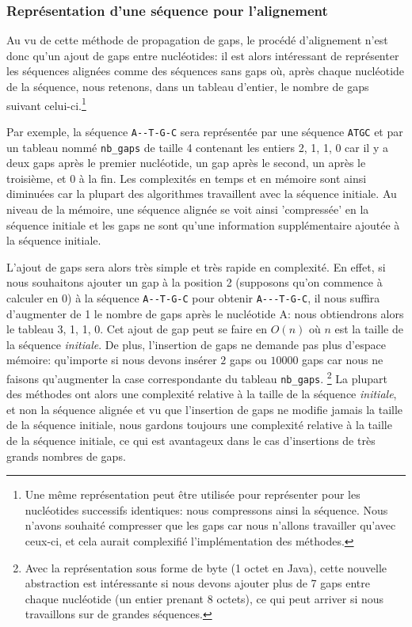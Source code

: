 \subsubsection{Représentation d'une séquence pour l'alignement}
\label{subsubsection:repr_sequence_alignment}

Au vu de cette méthode de propagation de gaps, le procédé d'alignement n'est
donc qu'un ajout de gaps entre nucléotides: il est alors intéressant de
représenter les séquences alignées comme des séquences sans gaps où, après
chaque nucléotide de la séquence, nous retenons, dans un tableau d'entier, le
nombre de gaps suivant celui-ci.\footnote{Une même représentation peut être
	utilisée pour représenter pour les nucléotides successifs identiques: nous
	compressons ainsi la séquence. Nous n'avons souhaité compresser que les gaps
	car nous n'allons travailler qu'avec ceux-ci, et cela aurait complexifié
l'implémentation des méthodes.}

Par exemple, la séquence \verb|A--T-G-C| sera représentée par une séquence
\verb|ATGC| et par un tableau nommé \verb|nb_gaps| de taille 4
contenant les entiers {2, 1, 1, 0} car il y a deux gaps après le premier
nucléotide, un gap après le second, un après le troisième, et 0 à la fin. Les
complexités en temps et en mémoire sont ainsi diminuées car la plupart des
algorithmes travaillent avec la séquence initiale.
Au niveau de la mémoire, une séquence alignée se voit ainsi 'compressée' en la
séquence initiale et les gaps ne sont qu'une information supplémentaire ajoutée
à la séquence initiale.

L'ajout de gaps sera alors très simple et très rapide en complexité. En effet,
si nous souhaitons ajouter un gap à la position 2 (supposons qu'on commence à
calculer en 0) à la séquence \verb|A--T-G-C| pour obtenir \verb|A---T-G-C|, il
nous suffira d'augmenter de 1 le nombre de gaps après le nucléotide A: nous
obtiendrons alors le tableau {3, 1, 1, 0}. Cet ajout de gap peut se faire en
$O(n)$ où $n$ est la taille de la séquence \textit{initiale}. De plus,
l'insertion de gaps ne demande pas plus d'espace mémoire: qu'importe si nous
devons insérer $2$ gaps ou $10000$ gaps car nous ne faisons qu'augmenter la case
correspondante du tableau \verb|nb_gaps|. \footnote{Avec la représentation sous
	forme de byte (1 octet en Java), cette nouvelle abstraction est intéressante
si nous devons ajouter plus de 7 gaps entre chaque nucléotide (un entier prenant
8 octets), ce qui peut arriver si nous travaillons sur de grandes séquences.} La
plupart des méthodes ont alors une complexité relative à la taille de la
séquence \textit{initiale}, et non la séquence alignée et vu que l'insertion de
gaps ne modifie jamais la taille de la séquence initiale, nous
gardons toujours une complexité relative à la taille de la séquence initiale, ce
qui est avantageux dans le cas d'insertions de très grands nombres de gaps.

